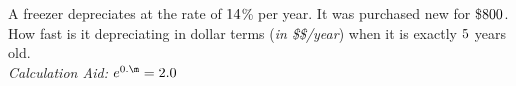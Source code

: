 



\MULTIPLY\dep\yrs\m
\gcalcexpr[2]

\question[3] A freezer depreciates at the rate of $14$\% per year. It
was purchased new for \$$800$. How fast is it depreciating in dollar
terms (\textit{in \$\$/year}) when it is exactly $5$ years old.\\
\textit{Calculation Aid: $e^{0.\m}=\calcaid$}

\watchout

